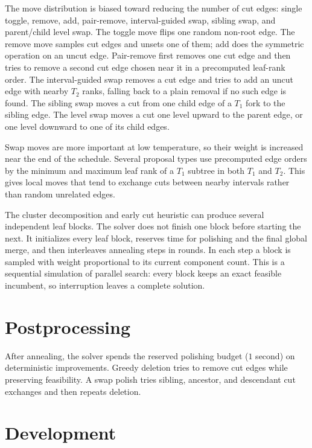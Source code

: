 \documentclass[a4paper,UKenglish,cleveref,autoref]{lipics-v2021}
\begin{document}
The move distribution is biased toward reducing the number of cut
edges: single toggle, remove, add, pair-remove, interval-guided swap, sibling
swap, and parent/child level swap.
The toggle move flips one random non-root edge.  The remove move samples cut
edges and unsets one of them; add does the symmetric operation on an uncut edge.
Pair-remove first removes one cut edge and then tries to remove a second cut
edge chosen near it in a precomputed leaf-rank order.  The interval-guided swap
removes a cut edge and tries to add an uncut edge with nearby \(T_2\) ranks,
falling back to a plain removal if no such edge is found.  The sibling swap
moves a cut from one child edge of a \(T_1\) fork to the sibling edge.  The
level swap moves a cut one level upward to the parent edge, or one level
downward to one of its child edges.

Swap moves are more important at low temperature, so their weight is increased
near the end of the schedule.
Several proposal types use precomputed edge orders by the minimum and maximum leaf rank
of a \(T_1\) subtree in both \(T_1\) and \(T_2\).  This gives local moves that
tend to exchange cuts between nearby intervals rather than random unrelated
edges.

The cluster decomposition and early cut heuristic can
produce several independent leaf blocks. The solver does not finish one block
before starting the next.  It initializes every leaf block, reserves time for
polishing and the final global merge, and then interleaves annealing steps in
rounds.  In each step a block is sampled with weight proportional to its current
component count.  This is a sequential simulation of parallel search: every block
keeps an exact feasible incumbent, so interruption leaves a complete solution.

\section{Postprocessing}

After annealing, the solver spends the reserved polishing budget ($1$ second) on
deterministic improvements.
Greedy deletion tries to remove cut edges while preserving feasibility.
A swap polish tries sibling, ancestor, and descendant cut exchanges and then
repeats deletion.

\section{Development}
\end{document}

